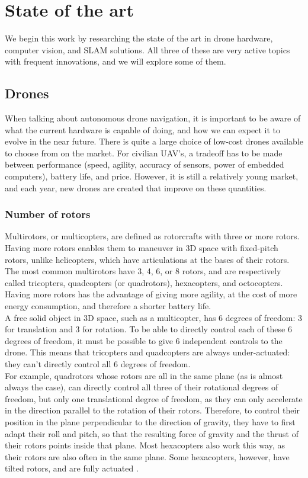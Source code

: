 \chapter{State of the art} %
We begin this work by researching the state of the art in drone hardware, computer vision, and SLAM solutions. All three of these are very active topics with frequent innovations, and we will explore some of them.

\section{Drones}
When talking about autonomous drone navigation, it is important to be aware of what the current hardware is capable of doing, and how we can expect it to evolve in the near future. There is quite a large choice of low-cost drones available to choose from on the market. For civilian UAV's, a tradeoff has to be made between performance (speed, agility, accuracy of sensors, power of embedded computers), battery life, and price. However, it is still a relatively young market, and each year, new drones are created that improve on these quantities.

\subsection{Number of rotors}
Multirotors, or multicopters, are defined as rotorcrafts with three or more rotors. Having more rotors enables them to maneuver in 3D space with fixed-pitch rotors, unlike helicopters, which have articulations at the bases of their rotors. The most common multirotors have 3, 4, 6, or 8 rotors, and are respectively called tricopters, quadcopters (or quadrotors), hexacopters, and octocopters. Having more rotors has the advantage of giving more agility, at the cost of more energy consumption, and therefore a shorter battery life.\\

A free solid object in 3D space, such as a multicopter, has 6 degrees of freedom: 3 for translation and 3 for rotation. To be able to directly control each of these 6 degrees of freedom, it must be possible to give 6 independent controls to the drone. This means that tricopters and quadcopters are always under-actuated: they can't directly control all 6 degrees of freedom.\\

For example, quadrotors whose rotors are all in the same plane (as is almost always the case), can directly control all three of their rotational degrees of freedom, but only one translational degree of freedom, as they can only accelerate in the direction parallel to the rotation of their rotors. Therefore, to control their position in the plane perpendicular to the direction of gravity, they have to first adapt their roll and pitch, so that the resulting force of gravity and the thrust of their rotors points inside that plane. Most hexacopters also work this way, as their rotors are also often in the same plane. Some hexacopters, however, have tilted rotors, and are fully actuated  \cite{dexteroushexrotor}. \\

